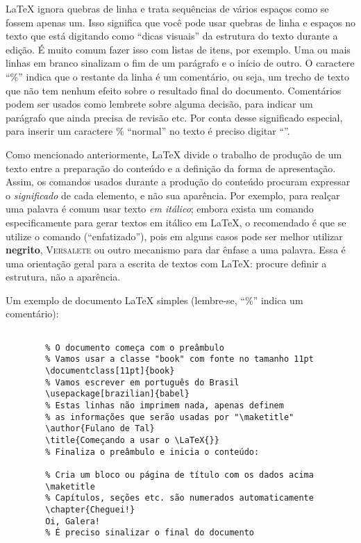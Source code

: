 \LaTeX{} ignora quebras de linha e trata sequências de vários espaços como
se fossem apenas um. Isso significa que você pode usar quebras de linha e
espaços no texto que está digitando como ``dicas visuais'' da estrutura do
texto durante a edição. É muito comum fazer isso com listas de itens, por
exemplo. Uma ou mais linhas em branco sinalizam o fim de um parágrafo e o
início de outro. O caractere ``\%'' indica que o restante da linha é um
comentário, ou seja, um trecho de texto que não tem nenhum efeito sobre o
resultado final do documento. Comentários podem ser usados como lembrete sobre
alguma decisão, para indicar um parágrafo que ainda precisa de revisão etc.
Por conta desse significado especial, para inserir um caractere \% ``normal''
no texto é preciso digitar ``\ltxcmd{\%}''.

Como mencionado anteriormente, \LaTeX{} divide o trabalho de produção
de um texto entre a preparação do conteúdo e a definição da forma de
apresentação. Assim, os comandos usados durante a produção do conteúdo
procuram expressar o \emph{significado} de cada elemento, e não sua
aparência. Por exemplo, para realçar uma palavra é comum usar texto
\textit{em itálico}; embora exista um comando especificamente para gerar
textos em itálico em \LaTeX{}, o recomendado é que se utilize o comando
 (``enfatizado''), pois em alguns casos pode ser melhor
utilizar \textbf{negrito}, \textsc{Versalete} ou outro mecanismo para
dar ênfase a uma palavra. Essa é uma orientação geral para a escrita de
textos com \LaTeX{}: procure definir a estrutura, não a aparência.

Um exemplo de documento \LaTeX{} simples (lembre-se, ``\%'' indica um comentário):

\begin{verbatim}

        % O documento começa com o preâmbulo
        % Vamos usar a classe "book" com fonte no tamanho 11pt
        \documentclass[11pt]{book}
        % Vamos escrever em português do Brasil
        \usepackage[brazilian]{babel}
        % Estas linhas não imprimem nada, apenas definem
        % as informações que serão usadas por "\maketitle"
        \author{Fulano de Tal}
        \title{Começando a usar o \LaTeX{}}
        % Finaliza o preâmbulo e inicia o conteúdo:
        
        % Cria um bloco ou página de título com os dados acima
        \maketitle
        % Capítulos, seções etc. são numerados automaticamente
        \chapter{Cheguei!}
        Oi, Galera!
        % É preciso sinalizar o final do documento
        

\end{verbatim}

